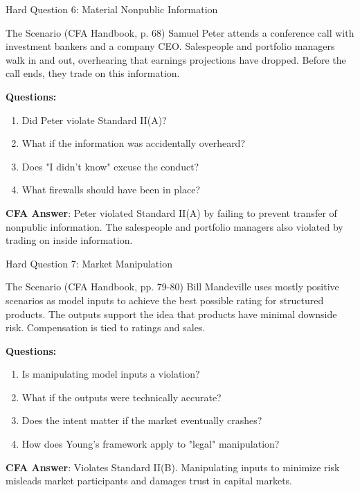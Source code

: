 \documentclass{beamer}
\begin{document}
	\begin{frame}{Hard Question 6: Material Nonpublic Information}
		\begin{block}{The Scenario (CFA Handbook, p. 68)}
			Samuel Peter attends a conference call with investment bankers and a company CEO. Salespeople and portfolio managers walk in and out, overhearing that earnings projections have dropped. Before the call ends, they trade on this information.
		\end{block}
		
		\vspace{0.2cm}
		\textbf{Questions:}
		\begin{enumerate}
			\item Did Peter violate Standard II(A)?
			\item What if the information was accidentally overheard?
			\item Does "I didn't know" excuse the conduct?
			\item What firewalls should have been in place?
		\end{enumerate}
		
		\vspace{0.2cm}
		\textcolor{cfablue}{\textbf{CFA Answer}}: Peter violated Standard II(A) by failing to prevent transfer of nonpublic information. The salespeople and portfolio managers also violated by trading on inside information.
	\end{frame}
	
	\begin{frame}{Hard Question 7: Market Manipulation}
		\begin{block}{The Scenario (CFA Handbook, pp. 79-80)}
			Bill Mandeville uses mostly positive scenarios as model inputs to achieve the best possible rating for structured products. The outputs support the idea that products have minimal downside risk. Compensation is tied to ratings and sales.
		\end{block}
		
		\vspace{0.2cm}
		\textbf{Questions:}
		\begin{enumerate}
			\item Is manipulating model inputs a violation?
			\item What if the outputs were technically accurate?
			\item Does the intent matter if the market eventually crashes?
			\item How does Young's framework apply to "legal" manipulation?
		\end{enumerate}
		
		\vspace{0.2cm}
		\textcolor{cfablue}{\textbf{CFA Answer}}: Violates Standard II(B). Manipulating inputs to minimize risk misleads market participants and damages trust in capital markets.
	\end{frame}
	
\end{document}
